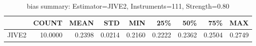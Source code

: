 \begin{table}[ht]
\centering
\caption{bias summary: Estimator=JIVE2, Instruments=111, Strength=0.80}
\begin{tabular}{lrrrrrrrr}
\toprule
 & COUNT & MEAN & STD & MIN & 25\% & 50\% & 75\% & MAX \\
\midrule
JIVE2 & 10.0000 & 0.2398 & 0.0214 & 0.2160 & 0.2222 & 0.2362 & 0.2504 & 0.2749 \\
\bottomrule
\end{tabular}
\end{table}
